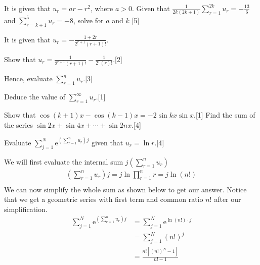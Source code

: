\documentclass[12pt, a4 paper]{article}
\begin{document}
\begin{outline}[enumerate]
 \1 It is given that \(u_{r}=ar-r^2\), where \(a>0\). Given that \(\frac{1}{2k(2k+1)}\sum\limits_{r=1}^{2k}u_{r}=-\frac{13}{6}\) and \(\sum\limits_{r=k+1}^{5}u_{r}=-8\), solve for \(a\)  and \(k\) \hfill[5] %

 \1 It is given that \(u_{r}=-\frac{1+2r}{2^{r+1}(r+1)!}\). %

 \2 Show that \(u_{r}=\frac{1}{2^{r+1}(r+1)!}-\frac{1}{2^{r}(r)!}\).\hfill[2]

 \2 Hence, evaluate \(\sum\limits_{r=1}^{n}u_r\).\hfill[3]

 \2 Deduce the value of \(\sum\limits_{r=1}^{\infty}u_r\).\hfill[1]

 \1
 \2 Show that \(\cos{(k+1)}x-\cos{(k-1)x}=-2\sin{kx}\sin{x}\).\hfill[1]
 \2 Find the sum of the series \(\sin{2x}+\sin{4x}+\cdots+\sin{2nx}\).\hfill[4]%

 \1 Evaluate \(\sum\limits_{j=1}^{N}\mathrm{e}^{\left(\sum\limits_{r=1}^{n}u_{r}\right)j}\) given that \(u_{r}=\ln{r}\).\hfill[4]%
 \begin{answer}
  We will first evaluate the internal sum \(j\left(\sum\limits_{r=1}^{n}u_{r}\right)\)
  \begin{align*}
   (\sum\limits_{r=1}^{n}u_{r})j= j\ln\prod_{r=1}^n r = j\ln{(n!)} \\
  \end{align*}
  We can now simplify the whole sum as shown below to get our answer. Notice that we get a geometric series with first term and common ratio \(n! \) after our simplification.
  \begin{align*}
   \sum\limits_{j=1}^{N}\mathrm{e}^{\left(\sum\limits_{r=1}^{n}u_{r}\right)j} & =      \sum\limits_{j=1}^{N}\mathrm{e}^{\ln(n!) \cdot j} \\
                                                                              & = \sum\limits_{j=1}^{N}{(n!)}^j                          \\
                                                                              & = \frac{n![{(n!)}^N-1]}{n!-1}
  \end{align*}
 \end{answer}
\end{outline}
\end{document}
